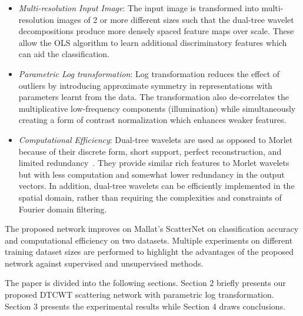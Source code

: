 \documentclass{article}
\begin{document}
\begin{itemize}[topsep=2.2pt]
\itemsep0em 
\item \textit{Multi-resolution Input Image}: The input image is transformed into multi-resolution images of 2 or more different sizes such that the dual-tree wavelet decompositions produce more densely spaced feature maps over scale. These allow the OLS algorithm to learn additional discriminatory features which can aid the classification.  
 
\item \textit{Parametric Log transformation}: Log transformation reduces the effect of outliers by introducing approximate symmetry in representations with parameters learnt from the data. The transformation also de-correlates the multiplicative low-frequency components (illumination) while simultaneously creating a form of contrast normalization which enhances weaker features. 

\item \textit{Computational Efficiency}: 
Dual-tree wavelets are used as opposed to Morlet ~\cite{Jbruna2013} because of their discrete form, short support, perfect reconstruction, and limited redundancy~\cite{Kingsbury1998}. They provide similar rich features to Morlet wavelets but with less computation and somewhat lower redundancy in the output vectors. In addition, dual-tree wavelets can be efficiently implemented in the spatial domain, rather than requiring the complexities and constraints of Fourier domain filtering. 

  \end{itemize}

The proposed network improves on Mallat's ScatterNet on classification accuracy and computational efficiency on two datasets. Multiple experiments on different training dataset sizes are performed to highlight the advantages of the proposed network against supervised and unsupervised methods.

  The paper is divided into the following sections. Section 2 briefly presents our proposed DTCWT scattering network with parametric log transformation. Section 3 presents the experimental results while Section 4 draws conclusions.
\end{document}
